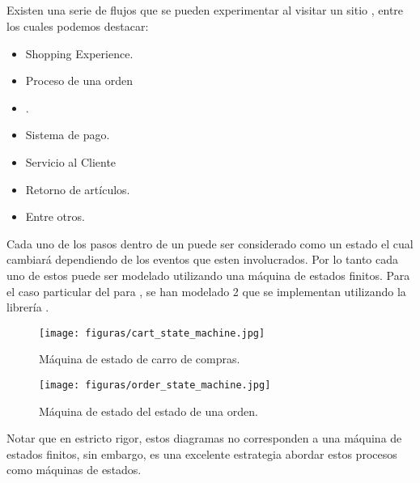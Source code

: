 
\subsection{\workflowsCPT}


Existen una serie de flujos que se pueden experimentar al visitar un sitio \ecommerceCOM, entre los cuales podemos destacar:

	\begin{itemize}
		\item
			Shopping Experience.
		\item
			Proceso de una orden
		\item
			\shipping.
		\item
			Sistema de pago.
		\item
			Servicio al Cliente
		\item
			Retorno de artículos.
		\item
			Entre otros. 
	\end{itemize}


Cada uno de los pasos dentro de un \workflowsCPT puede ser considerado como un estado el cual cambiará dependiendo de los eventos que esten involucrados. Por lo tanto cada uno de estos \workflowsCPT puede ser modelado utilizando una máquina de estados finitos.
Para el caso particular del \frameworkPC para \ecommerceCOM, se han modelado 2 \workflowsCPT que se implementan utilizando la librería \javaScriptNAME \finiteStateMachine.

\begin{figure}[H]
	\centering
	\texttt{[image: figuras/cart\_state\_machine.jpg]}

	\caption{Máquina de estado de carro de compras.}
	\label{figure:cart_state_machine}
\end{figure}


\begin{figure}[H]
	\centering
	\texttt{[image: figuras/order\_state\_machine.jpg]}

	\caption{Máquina de estado del estado de una orden.}
	\label{figure:order_state_machine}
\end{figure}

Notar que en estricto rigor, estos diagramas no corresponden a una máquina de estados finitos, sin embargo, es una excelente estrategia abordar estos procesos como máquinas de estados.
